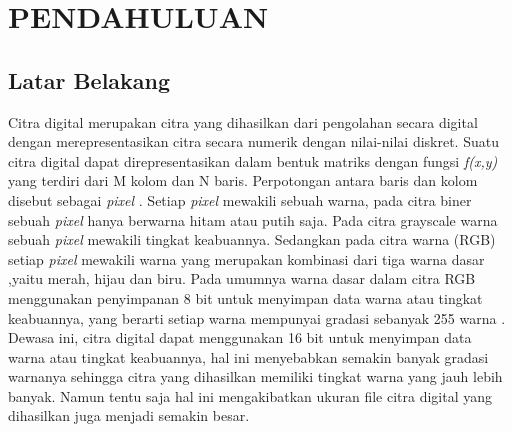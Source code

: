 
\chapter{PENDAHULUAN}

\section{Latar Belakang}
Citra digital merupakan citra yang dihasilkan dari pengolahan secara digital dengan merepresentasikan citra secara numerik dengan nilai-nilai diskret. Suatu citra digital dapat direpresentasikan dalam bentuk matriks dengan fungsi \textit{f(x,y)} yang terdiri dari M kolom dan N baris. Perpotongan antara baris dan kolom disebut sebagai \textit{pixel} . Setiap \textit{pixel} mewakili sebuah warna, pada citra biner sebuah \textit{pixel} hanya berwarna hitam atau putih saja. Pada citra grayscale warna sebuah \textit{pixel} mewakili tingkat keabuannya. Sedangkan pada citra warna (RGB) setiap \textit{pixel} mewakili warna yang merupakan kombinasi dari tiga warna dasar ,yaitu merah, hijau dan biru. Pada umumnya warna dasar dalam citra RGB menggunakan penyimpanan 8 bit untuk menyimpan data warna atau tingkat keabuannya, yang berarti setiap warna mempunyai gradasi sebanyak 255 warna . Dewasa ini, citra digital dapat menggunakan 16 bit untuk menyimpan data warna atau tingkat keabuannya, hal ini menyebabkan semakin banyak gradasi warnanya sehingga citra yang dihasilkan memiliki tingkat warna yang jauh lebih banyak. Namun tentu saja hal ini mengakibatkan ukuran file citra digital yang dihasilkan juga menjadi semakin besar.


